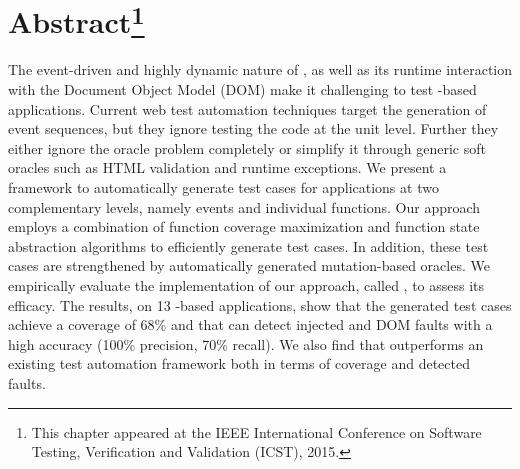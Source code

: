 \section*{Abstract\footnote{This chapter appeared at the IEEE International Conference on Software Testing, Verification and Validation (ICST), 2015.}}
The event-driven and highly dynamic nature of \javascript, as well as its runtime interaction with the Document Object Model (DOM) make it  challenging to test \javascript-based applications.
Current web test automation techniques target the generation of event sequences, but they ignore testing the \javascript code at the unit level. Further they either ignore the oracle problem completely or simplify it through generic soft oracles such as HTML validation and runtime exceptions. We present a framework to automatically generate test cases for \javascript applications at two complementary levels, namely events and individual \javascript  
functions. 
Our approach employs a combination of function coverage maximization and function state abstraction algorithms to efficiently generate  test cases. In addition, these test cases are strengthened by automatically generated mutation-based oracles. %
We empirically evaluate the implementation of our approach, called \jseft, to assess its efficacy. 
The results, on 13 \javascript-based applications, show that the generated test cases achieve a coverage of 68\% and that \jseft can detect injected \javascript and DOM faults with a high accuracy (100\% precision, 70\% recall).
We also find that \jseft outperforms an existing \javascript test automation framework both in terms of coverage and detected faults.

